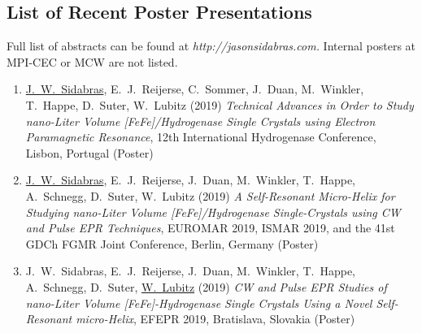 \subsection*{List of Recent Poster Presentations}
Full list of abstracts can be found at \textit{http://jasonsidabras.com.} Internal posters at MPI-CEC or MCW are not listed.
\begin{enumerate}
\itemsep0em 
    \item \underline{J.~W.~Sidabras}, E.~J.~Reijerse, C.~Sommer, J.~Duan, M.~Winkler, T.~Happe, D.~Suter, W.~Lubitz (2019) {\em Technical Advances in Order to Study nano-Liter Volume [FeFe]\-/Hydrogenase Single Crystals using Electron Paramagnetic Resonance}, 12th International Hydrogenase Conference, Lisbon, Portugal (Poster)
    \item \underline{J.~W.~Sidabras}, E.~J.~Reijerse, J.~Duan, M.~Winkler, T.~Happe, A.~Schnegg, D.~Suter, W.~Lubitz (2019) {\em A Self-Resonant Micro-Helix for Studying nano-Liter Volume [FeFe]\-/Hydrogenase Single-Crystals using CW and Pulse EPR Techniques}, EUROMAR 2019, ISMAR 2019, and the 41st GDCh FGMR Joint Conference, Berlin, Germany (Poster)
    \item J.~W.~Sidabras, E.~J.~Reijerse, J.~Duan, M.~Winkler, T.~Happe, A.~Schnegg, D.~Suter, \underline{W.~Lubitz} (2019) {\em CW and Pulse EPR Studies of nano-Liter Volume [FeFe]-Hydrogenase Single Crystals Using a Novel Self-Resonant micro-Helix}, EFEPR 2019, Bratislava, Slovakia (Poster)
\end{enumerate}
